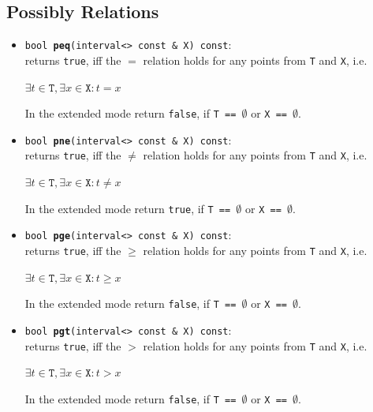 \documentclass{report}
\begin{document}
\subsection{Possibly Relations}
\begin{itemize}
			\item \texttt{bool {\bf peq}(interval<> const \& X) const}:\\returns  \texttt{true}, iff the $=$ relation holds for any
			points from \texttt{T} and \texttt{X}, i.e.
\begin{center} $\exists t \in \texttt{T},\exists x \in \texttt{X}  :
			t =x $\end{center}

In the extended mode return \texttt{false}, if 
				\texttt{T == $\emptyset$} or \texttt{X == $\emptyset$}.

			\item \texttt{bool {\bf pne}(interval<> const \& X) const}:\\returns  \texttt{true}, iff the $\neq$ relation holds for any
			points from \texttt{T} and \texttt{X}, i.e.
\begin{center} $\exists t \in \texttt{T},\exists x \in \texttt{X}  :
			t \neq x $\end{center}

In the extended mode return \texttt{true}, if 
				\texttt{T == $\emptyset$} or \texttt{X == $\emptyset$}.

			\item \texttt{bool {\bf pge}(interval<> const \& X) const}:\\returns  \texttt{true}, iff the $\geq$ relation holds for any
			points from \texttt{T} and \texttt{X}, i.e.
\begin{center} $\exists t \in \texttt{T},\exists x \in \texttt{X}  :
			t \geq x $\end{center}

In the extended mode return \texttt{false}, if 
				\texttt{T == $\emptyset$} or \texttt{X == $\emptyset$}.

			\item \texttt{bool {\bf pgt}(interval<> const \& X) const}:\\returns  \texttt{true}, iff the $>$ relation holds for any
			points from \texttt{T} and \texttt{X}, i.e.
\begin{center} $\exists t \in \texttt{T},\exists x \in \texttt{X}  :
			t > x $\end{center}

In the extended mode return \texttt{false}, if 
				\texttt{T == $\emptyset$} or \texttt{X == $\emptyset$}.


\end{itemize}
\end{document}
